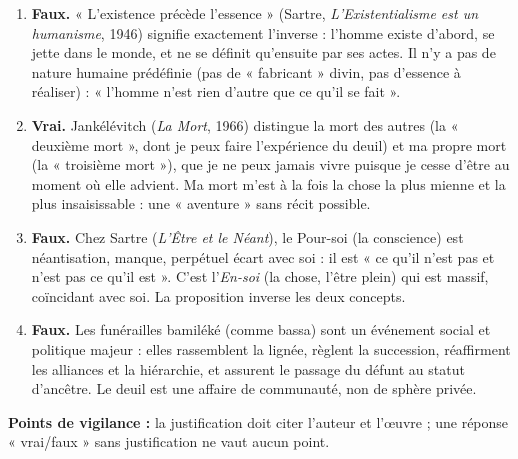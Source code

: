 \documentclass[11pt]{article}
\newcommand{\cle}[1]{{\popxbold\color{popdark}#1}}
\begin{document}
\begin{corrige}
\begin{enumerate}
\item \textbf{Faux.} « L'existence précède l'essence » (Sartre, \emph{L'Existentialisme est un humanisme}, 1946) signifie exactement l'inverse : l'homme existe d'abord, se jette dans le monde, et ne se définit qu'ensuite par ses actes. Il n'y a pas de nature humaine prédéfinie (pas de « fabricant » divin, pas d'essence à réaliser) : « l'homme n'est rien d'autre que ce qu'il se fait ».
\item \textbf{Vrai.} Jankélévitch (\emph{La Mort}, 1966) distingue la mort des autres (la « deuxième mort », dont je peux faire l'expérience du deuil) et ma propre mort (la « troisième mort »), que je ne peux jamais vivre puisque je cesse d'être au moment où elle advient. Ma mort m'est à la fois la chose la plus mienne et la plus insaisissable : une « aventure » sans récit possible.
\item \textbf{Faux.} Chez Sartre (\emph{L'Être et le Néant}), le \cle{Pour-soi} (la conscience) est néantisation, manque, perpétuel écart avec soi : il est « ce qu'il n'est pas et n'est pas ce qu'il est ». C'est l'\emph{En-soi} (la chose, l'être plein) qui est massif, coïncidant avec soi. La proposition inverse les deux concepts.
\item \textbf{Faux.} Les funérailles bamiléké (comme bassa) sont un événement social et politique majeur : elles rassemblent la lignée, règlent la succession, réaffirment les alliances et la hiérarchie, et assurent le passage du défunt au statut d'ancêtre. Le deuil est une affaire de communauté, non de sphère privée.
\end{enumerate}
\textbf{Points de vigilance :} la justification doit citer l'auteur et l'œuvre ; une réponse « vrai/faux » sans justification ne vaut aucun point.
\end{corrige}
\end{document}
